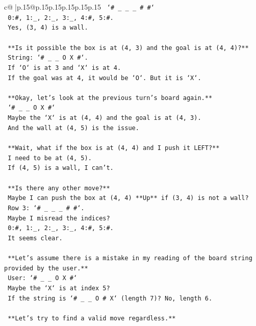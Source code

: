 \documentclass{article}
\begin{document}
{\begin{supertabular}{c@{$\;$}|p{.15\linewidth}@{}p{.15\linewidth}p{.15\linewidth}p{.15\linewidth}p{.15\linewidth}p{.15\linewidth}}
{{{\texttt{    `\# \_ \_ \_ \# \#`} \\
\texttt{    0:\#, 1:\_, 2:\_, 3:\_, 4:\#, 5:\#.} \\
\texttt{    Yes, (3, 4) is a wall.} \\
\\ 
\texttt{    **Is it possible the box is at (4, 3) and the goal is at (4, 4)?**} \\
\texttt{    String: `\# \_ \_ O X \#`.} \\
\texttt{    If `O` is at 3 and `X` is at 4.} \\
\texttt{    If the goal was at 4, it would be `O`. But it is `X`.} \\
\\ 
\texttt{    **Okay, let's look at the previous turn's board again.**} \\
\texttt{    `\# \_ \_ O X \#`} \\
\texttt{    Maybe the `X` is at (4, 4) and the goal is at (4, 3).} \\
\texttt{    And the wall at (4, 5) is the issue.} \\
\\ 
\texttt{    **Wait, what if the box is at (4, 4) and I push it LEFT?**} \\
\texttt{    I need to be at (4, 5).} \\
\texttt{    If (4, 5) is a wall, I can't.} \\
\\ 
\texttt{    **Is there any other move?**} \\
\texttt{    Maybe I can push the box at (4, 4) **Up** if (3, 4) is not a wall?} \\
\texttt{    Row 3: `\# \_ \_ \_ \# \#`.} \\
\texttt{    Maybe I misread the indices?} \\
\texttt{    0:\#, 1:\_, 2:\_, 3:\_, 4:\#, 5:\#.} \\
\texttt{    It seems clear.} \\
\\ 
\texttt{    **Let's assume there is a mistake in my reading of the board string provided by the user.**} \\
\texttt{    User: `\# \_ \_ O X \#`} \\
\texttt{    Maybe the `X` is at index 5?} \\
\texttt{    If the string is `\# \_ \_ O \# X` (length 7)? No, length 6.} \\
\\ 
\texttt{    **Let's try to find a valid move regardless.**} \\
}}}
\end{supertabular}}
\end{document}
